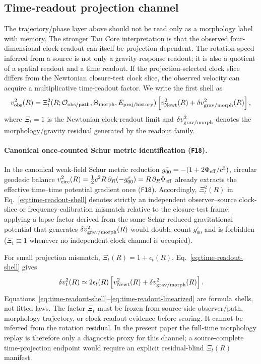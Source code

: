 \documentclass[11pt]{article}
\begin{document}
\subsection{Time-readout projection channel}

The trajectory/phase layer above should not be read only as a morphology label
with memory.  The stronger Tau Core interpretation is that the observed
four-dimensional clock readout can itself be projection-dependent.  The
rotation speed inferred from a source is not only a gravity-response readout;
it is also a quotient of a spatial readout and a time readout.  If the
projection-selected clock slice differs from the Newtonian closure-test clock
slice, the observed velocity can acquire a multiplicative time-readout factor.
We write the first shell as
\begin{equation}
  v_{\rm obs}^2(R)
  =
  \Xi_t^2(R;{\cal O}_{\rm obs/path},\Theta_{\rm morph},E_{\rm proj/history})
  \left[
    v_{\rm Newt}^2(R)
    +
    \delta v_{\rm grav/morph}^2(R)
  \right] ,
  \label{eq:time-readout-shell}
\end{equation}
where \(\Xi_t=1\) is the Newtonian clock-readout limit and
\(\delta v_{\rm grav/morph}^2\) denotes the morphology/gravity residual
generated by the readout family.

\paragraph{Canonical once-counted Schur metric identification (\texttt{F18}).}
In the canonical weak-field Schur metric reduction
\(g_{00}^\tau=-(1+2\Phi_{\rm eff}/c^2)\), circular geodesic balance
\(v_{\rm circ}^2(R)=\frac{1}{2}c^2 R\,\partial_R(-g_{00}^\tau)=R\,\partial_R\Phi_{\rm eff}\)
already extracts the effective time--time potential gradient once (\texttt{F18}).
Accordingly, \(\Xi_t^2(R)\) in Eq.~\eqref{eq:time-readout-shell} denotes
strictly an independent observer--source clock-slice or frequency-calibration
mismatch relative to the closure-test frame; applying a lapse factor derived
from the same Schur-reduced gravitational potential that generates
\(\delta v_{\rm grav/morph}^2(R)\) would double-count \(g_{00}^\tau\) and is
forbidden (\(\Xi_t\equiv 1\) whenever no independent clock channel is occupied).

For small projection mismatch, \(\Xi_t(R)=1+\epsilon_t(R)\), Eq.~\eqref{eq:time-readout-shell} gives
\begin{equation}
  \delta v_t^2(R)
  \simeq
  2\epsilon_t(R)
  \left[
    v_{\rm Newt}^2(R)
    +
    \delta v_{\rm grav/morph}^2(R)
  \right] .
  \label{eq:time-readout-linearized}
\end{equation}
Equations~\eqref{eq:time-readout-shell}--\eqref{eq:time-readout-linearized}
are formula shells, not fitted laws.  The factor \(\Xi_t\) must be frozen from
source-side observer/path, morphology-trajectory, or clock-readout evidence
before scoring.  It cannot be inferred from the rotation residual.  In the
present paper the full-time morphology replay is therefore only a diagnostic
proxy for this channel; a source-complete time-projection endpoint would
require an explicit residual-blind \(\Xi_t(R)\) manifest.
\end{document}

